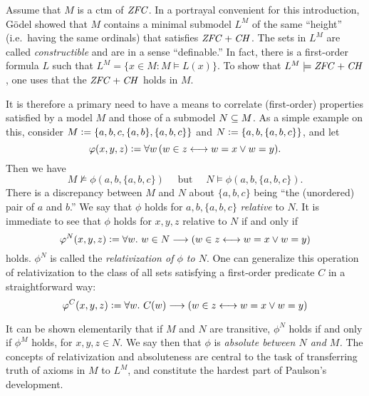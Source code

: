Assume that $M$ is a ctm of $\mathit{ZFC}$. In a portrayal convenient for this
introduction, G\"odel showed that $M$ contains a minimal submodel
$L^M$ of the same ``height'' (i.e.\ having the same ordinals)
that satisfies $\mathit{ZFC}+\mathit{CH}$. The sets in $L^M$ are called
\emph{constructible} and are in a sense ``definable.'' In fact, there
is a first-order formula $L$ such that $L^M = \{x\in M : M\models
L(x)\}$. To show that  $L^M\models \mathit{ZFC}+\mathit{CH}$, one uses that the
$\mathit{ZFC}+\mathit{CH}$ holds in $M$.

It is therefore a primary need to have a means to correlate  (first-order)
properties satisfied by a model $M$ and those of a 
submodel $N\subseteq M$. As a simple example on this, consider 
$M\mathrel{\mathop:}= \{a,b,c, \{a,b\},\{a,b,c\}\}$ and
$N\mathrel{\mathop:}=\{a,b,\{a,b,c\}\}$, and let 
\[
\varphi(x,y,z)\mathrel{\mathop:}= \forall w \,( w\in z \longleftrightarrow w=x \vee w=y).
\]
Then we have
\[
M\not\models \phi(a,b,\{a,b,c\}) \quad\text{ but }\quad N\models \phi(a,b,\{a,b,c\}).
\]
There is a discrepancy between  $M$ and $N$ about $\{a,b,c\}$ being ``the
(unordered) pair of $a$ and $b$.'' We say that $\phi$ holds for
$a,b,\{a,b,c\}$ \emph{relative} to $N$. It is immediate to see that
$\phi$ holds  for $x,y,z$ relative to $N$ if and only if
\[
\varphi^N(x,y,z)\mathrel{\mathop:}= \forall w.\ w\in N\longrightarrow ( w\in z \longleftrightarrow w=x \vee w=y)
\] 
holds. $\phi^N$ is called the \emph{relativization of $\phi$ to
  $N$}. One can generalize this operation of relativization to the
class of all sets satisfying a first-order predicate $C$ in a
straightforward way:
\[
\varphi^C(x,y,z)\mathrel{\mathop:}= \forall w.\ C(w)\longrightarrow ( w\in z \longleftrightarrow w=x \vee w=y)
\] 

It can be shown elementarily that if $M$ and $N$ are transitive,
$\phi^N$ holds if and only if $\phi^M$ holds,  for $x,y,z\in N$. We
say then that $\phi$ is \emph{absolute between $N$ and $M$.}
The concepts of relativization and absoluteness are central to the
task of transferring truth of axioms in $M$ to $L^M$, and constitute
the hardest part of Paulson's development.


